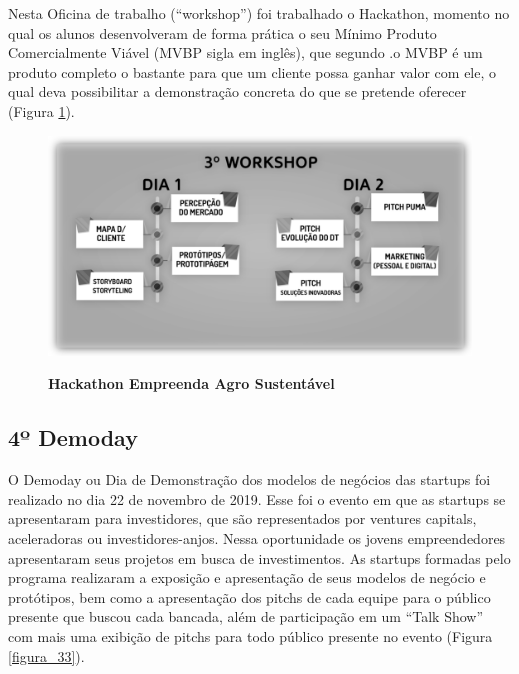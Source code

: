 Nesta Oficina de trabalho (“workshop”) foi trabalhado o Hackathon, momento no qual os alunos desenvolveram de forma prática o seu Mínimo Produto Comercialmente Viável (MVBP sigla em inglês), que segundo .o MVBP é um produto completo o bastante para que um cliente possa ganhar valor com ele, o qual deva possibilitar a demonstração concreta do que se pretende oferecer (Figura \ref{figura_32}).

\begin{figure}[H]
\centering
\caption{\textbf{Hackathon Empreenda Agro Sustentável}}
\includegraphics[scale=0.3]{Imagens/workshop-03.png}
\label{figura_32}
\end{figure}

\subsection{4º Demoday}

O Demoday ou Dia de Demonstração dos modelos de negócios das startups foi realizado no dia 22 de novembro de 2019. Esse foi o evento em que as startups se apresentaram para investidores, que são representados por ventures capitals, aceleradoras ou investidores-anjos. Nessa oportunidade os jovens empreendedores apresentaram seus projetos em busca de investimentos. As startups formadas pelo programa realizaram a exposição e apresentação de seus modelos de negócio e protótipos, bem como a apresentação dos pitchs de cada equipe para o público presente que buscou cada bancada, além de participação em um “Talk Show” com mais uma exibição de pitchs para todo público presente no evento (Figura \ref{figura_33}).

